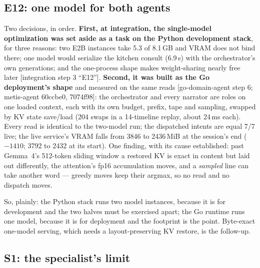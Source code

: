 \documentclass[11pt]{article}
\newcommand{\src}[1]{{\footnotesize\textsf{[#1]}}}
\begin{document}
\subsection{E12: one model for both agents}\label{sec:onemodel}

Two decisions, in order. \textbf{First, at integration, the single-model optimization was
set aside as a task on the Python development stack}, for three reasons: two E2B instances
take 5.3 of 8.1\,GB and VRAM does not bind there; one model would serialize the kitchen
consult (6.9\,s) with the orchestrator's own generations; and the one-process shape makes
weight-sharing nearly free later \src{integration step 3 ``E12''}. \textbf{Second, it was
built as the Go deployment's shape} and measured on the same reads \src{go-domain-agent
step 6; metis-agent 60ccbe0, 7074f98}: the orchestrator and every narrator are roles on one
loaded context, each with its own budget, prefix, tape and sampling, swapped by KV state
save/load (204 swaps in a 14-timeline replay, about 24\,ms each). Every read is identical
to the two-model run; the dispatched intents are equal 7/7 live; the live service's VRAM
falls from 3846 to 2436\,MiB at the session's end ($-1410$; 3792 to 2432 at its start). One
finding, with its cause established: past Gemma~4's 512-token sliding window a restored KV
is exact in content but laid out differently, the attention's fp16 accumulation moves, and
a \emph{sampled} line can take another word --- greedy moves keep their argmax, so no read
and no dispatch moves.

So, plainly: the Python stack runs two model instances, because it is for development and
the two halves must be exercised apart; the Go runtime runs one model, because it is for
deployment and the footprint is the point. Byte-exact one-model serving, which needs a
layout-preserving KV restore, is the follow-up.

\subsection{S1: the specialist's limit}\label{sec:s1}
\end{document}
